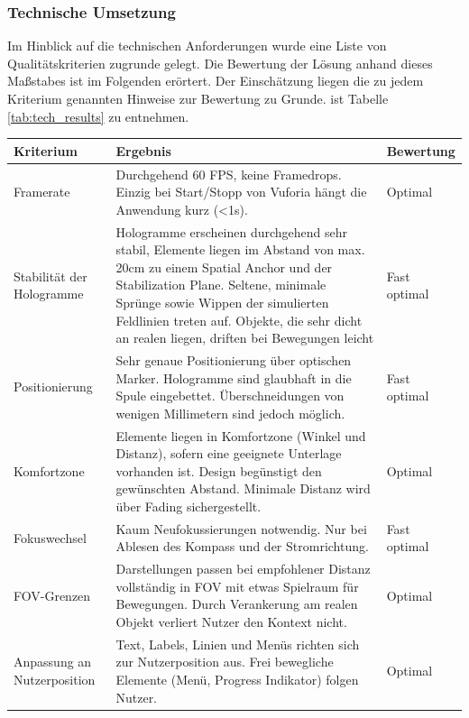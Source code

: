 \subsubsection{Technische Umsetzung}
Im Hinblick auf die technischen Anforderungen wurde eine Liste von Qualitätskriterien zugrunde gelegt. Die Bewertung der Lösung anhand dieses Maßstabes ist im Folgenden erörtert. Der Einschätzung liegen die zu jedem Kriterium genannten Hinweise zur Bewertung zu Grunde. ist Tabelle \ref{tab:tech_results} zu entnehmen. 
\begin{landscape}
	\bgroup
	\setlength\extrarowheight{-2pt}
	\def\arraystretch{1.8}
	\begin{table}
		\centering
		\begin{tabular}{m{2.3cm}|m{15.5cm}|m{2cm}}
			Kriterium & Ergebnis & Bewertung\\
			\hline
			\hline
			Framerate & Durchgehend 60 FPS, keine Framedrops. Einzig bei Start/Stopp von Vuforia hängt die Anwendung kurz (<1s). & Optimal\\
			\hline
			Stabilität der Hologramme & Hologramme erscheinen durchgehend sehr stabil, Elemente liegen im Abstand von max. 20cm zu einem Spatial Anchor und der Stabilization Plane. Seltene, minimale Sprünge sowie Wippen der simulierten Feldlinien treten auf. Objekte, die sehr dicht an realen liegen, driften bei Bewegungen leicht & Fast optimal\\
			\hline
			Positionierung & Sehr genaue Positionierung über optischen Marker. Hologramme sind glaubhaft in die Spule eingebettet. Überschneidungen von wenigen Millimetern sind jedoch möglich. & Fast optimal\\
			\hline
			Komfortzone & Elemente liegen in Komfortzone (Winkel und Distanz), sofern eine geeignete Unterlage vorhanden ist. Design begünstigt den gewünschten Abstand. Minimale Distanz wird über Fading sichergestellt. & Optimal\\
			\hline
			Fokuswechsel & Kaum Neufokussierungen notwendig. Nur bei Ablesen des Kompass und der Stromrichtung. & Fast optimal\\
			\hline
			FOV-Grenzen & Darstellungen passen bei empfohlener Distanz vollständig in FOV mit etwas Spielraum für Bewegungen. Durch Verankerung am realen Objekt verliert Nutzer den Kontext nicht. & Optimal\\
			\hline
			Anpassung an Nutzerposition & Text, Labels, Linien und Menüs richten sich zur Nutzerposition aus. Frei bewegliche Elemente (Menü, Progress Indikator) folgen Nutzer. & Optimal\\

\end{tabular}
\end{table}
\end{landscape}

